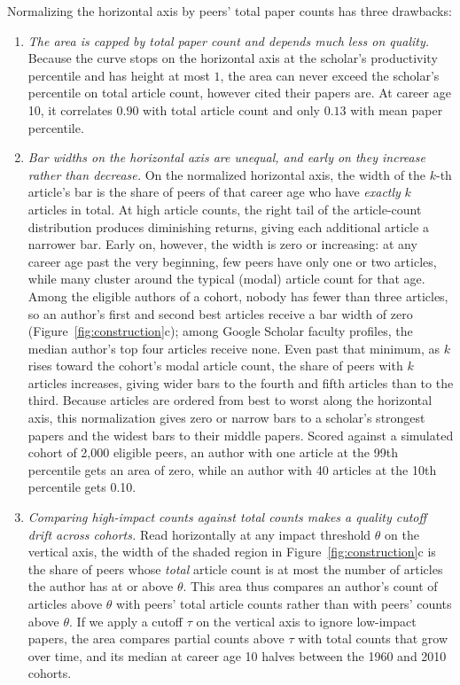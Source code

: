\documentclass[11pt]{article}
\begin{document}
Normalizing the horizontal axis by peers' total paper counts has three drawbacks:
\begin{enumerate}
  \item \emph{The area is capped by total paper count and depends much less on quality.} Because the curve stops on the
  horizontal axis at the scholar's productivity percentile and has height at most $1$, the area can never exceed the
  scholar's percentile on total article count, however cited their papers are. At career age 10, it correlates $0.90$
  with total article count and only $0.13$ with mean paper percentile.
  \item \emph{Bar widths on the horizontal axis are unequal, and early on they increase rather than decrease.} On the
  normalized horizontal axis, the width of the $k$-th article's bar is the share of peers of that career age who have
  \emph{exactly} $k$ articles in total. At high article counts, the right tail of the article-count distribution
  produces diminishing returns, giving each additional article a narrower bar. Early on, however, the width is zero or
  increasing: at any career age past the very beginning, few peers have only one or two articles, while many cluster
  around the typical (modal) article count for that age. Among the eligible authors of a cohort, nobody has fewer than
  three articles, so an author's first and second best articles receive a bar width of zero
  (Figure~\ref{fig:construction}c); among Google Scholar faculty profiles, the median author's top four articles receive
  none. Even past that minimum, as $k$ rises toward the cohort's modal article count, the share of peers with $k$
  articles increases, giving wider bars to the fourth and fifth articles than to the third. Because articles are ordered
  from best to worst along the horizontal axis, this normalization gives zero or narrow bars to a scholar's strongest
  papers and the widest bars to their middle papers. Scored against a simulated cohort of 2,000 eligible peers, an
  author with one article at the 99th percentile gets an area of zero, while an author with 40 articles at the 10th
  percentile gets 0.10.
  \item \emph{Comparing high-impact counts against total counts makes a quality cutoff drift across cohorts.} Read
  horizontally at any impact threshold $\theta$ on the vertical axis, the width of the shaded region in
  Figure~\ref{fig:construction}c is the share of peers whose \emph{total} article count is at most the number of
  articles the author has at or above $\theta$. This area thus compares an author's count of articles above $\theta$
  with peers' total article counts rather than with peers' counts above $\theta$. If we apply a cutoff $\tau$ on the
  vertical axis to ignore low-impact papers, the area compares partial counts above $\tau$ with total counts that grow
  over time, and its median at career age 10 halves between the 1960 and 2010 cohorts.
\end{enumerate}
\end{document}
